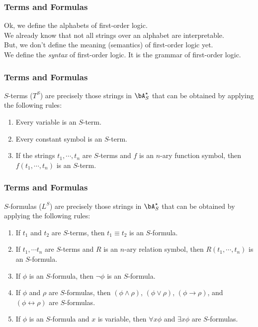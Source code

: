 \begin{frame}
    \frametitle{Terms and Formulas}
    
    Ok, we define the alphabets of first-order logic. \\
    We already know that not all strings over an alphabet are interpretable. \\
    But, we don't define the meaning (semantics) of first-order logic yet. \\
    \bigskip
    \pause
    We define the \textit{syntax} of first-order logic. It is the grammar of first-order logic. \\

\end{frame}

\begin{frame}
    \frametitle{Terms and Formulas}
    \begin{Definition}\label{def:terms}
        $S$-terms ($T^S$) are precisely those strings in $\bA_S^{\star}$ that can be obtained by applying the following rules:
        \begin{enumerate}
            \item Every variable is an $S$-term.
            \item Every constant symbol is an $S$-term.
            \item If the strings $t_1, \cdots, t_n$ are $S$-terms and $f$ is an $n$-ary function symbol, then $f(t_1, \cdots, t_n)$ is an $S$-term.
        \end{enumerate}
    \end{Definition}
\end{frame}

\begin{frame}
    \frametitle{Terms and Formulas}

    \begin{Definition}\label{def:formulas}
        $S$-formulas ($L^S$) are precisely those strings in $\bA_S^{\star}$ that can be obtained by applying the following rules:
        \begin{enumerate}
            \item If $t_1$ and $t_2$ are $S$-terms, then $t_1 \equiv t_2$ is an $S$-formula.
            \item If $t_1, \cdots t_n$ are $S$-terms and $R$ is an $n$-ary relation symbol, then $R(t_1, \cdots, t_n)$ is an $S$-formula.
            \item If $\phi$ is an $S$-formula, then $\neg \phi$ is an $S$-formula.
            \item If $\phi$ and $\rho$ are $S$-formulas, then $(\phi \wedge \rho)$, $(\phi \vee \rho)$, $(\phi \rightarrow \rho)$, and $(\phi \leftrightarrow \rho)$ are $S$-formulas.
            \item If $\phi$ is an $S$-formula and $x$ is variable, then $\forall x \phi$ and $\exists x \phi$ are $S$-formulas.
        \end{enumerate}
    \end{Definition}

\end{frame}

